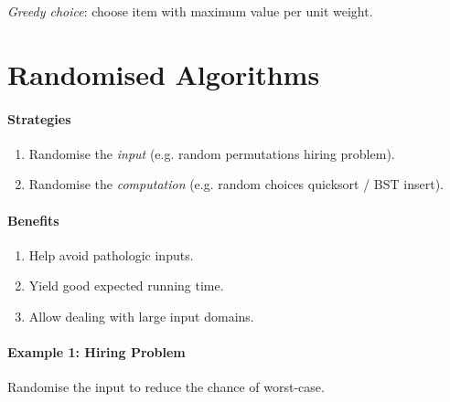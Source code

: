 \documentclass[twocolumn,english]{article}
\begin{document}
\emph{Greedy choice}: choose item with maximum value per unit weight.

\section{Randomised Algorithms}

\paragraph{Strategies}
\begin{enumerate}
\item Randomise the \emph{input} (e.g. random permutations \textemdash{}
hiring problem).
\item Randomise the \emph{computation} (e.g. random choices \textemdash{}
quicksort / BST insert).
\end{enumerate}

\paragraph{Benefits}
\begin{enumerate}
\item Help avoid pathologic inputs.
\item Yield good expected running time.
\item Allow dealing with large input domains.
\end{enumerate}

\paragraph{Example 1: Hiring Problem}

Randomise the input to reduce the chance of worst-case.
\end{document}
